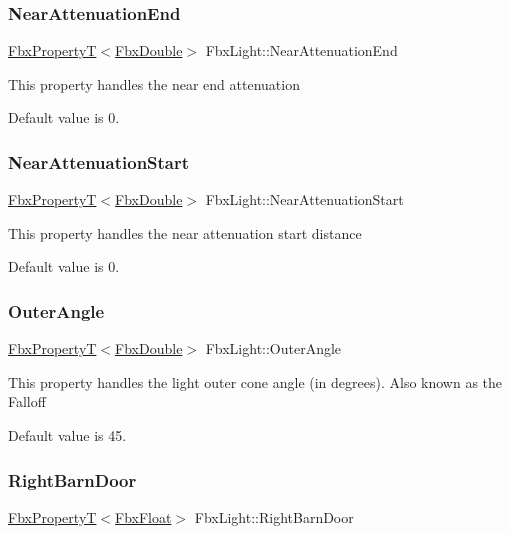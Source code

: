 \subsubsection{\texorpdfstring{Near\+Attenuation\+End}{NearAttenuationEnd}}
{\footnotesize\ttfamily \hyperlink{class_fbx_property_t}{Fbx\+PropertyT}$<$\hyperlink{fbxtypes_8h_a171e72a1c46fc15c1a6c9c31948c1c5b}{Fbx\+Double}$>$ Fbx\+Light\+::\+Near\+Attenuation\+End}

This property handles the near end attenuation

Default value is 0. \mbox{\label{class_fbx_light_aaad5d9617b23e08933e5360c948b3d26}} 
\subsubsection{\texorpdfstring{Near\+Attenuation\+Start}{NearAttenuationStart}}
{\footnotesize\ttfamily \hyperlink{class_fbx_property_t}{Fbx\+PropertyT}$<$\hyperlink{fbxtypes_8h_a171e72a1c46fc15c1a6c9c31948c1c5b}{Fbx\+Double}$>$ Fbx\+Light\+::\+Near\+Attenuation\+Start}

This property handles the near attenuation start distance

Default value is 0. \mbox{\label{class_fbx_light_ae4343cc9ecd82f2fde13d095b067fe68}} 
\subsubsection{\texorpdfstring{Outer\+Angle}{OuterAngle}}
{\footnotesize\ttfamily \hyperlink{class_fbx_property_t}{Fbx\+PropertyT}$<$\hyperlink{fbxtypes_8h_a171e72a1c46fc15c1a6c9c31948c1c5b}{Fbx\+Double}$>$ Fbx\+Light\+::\+Outer\+Angle}

This property handles the light outer cone angle (in degrees). Also known as the Falloff

Default value is 45. \mbox{\label{class_fbx_light_aea237e743f2b2e2d5a2e3cdf28a78290}} 
\subsubsection{\texorpdfstring{Right\+Barn\+Door}{RightBarnDoor}}
{\footnotesize\ttfamily \hyperlink{class_fbx_property_t}{Fbx\+PropertyT}$<$\hyperlink{fbxtypes_8h_aef968e37f2ddc4188de464d8578c1d5c}{Fbx\+Float}$>$ Fbx\+Light\+::\+Right\+Barn\+Door}

